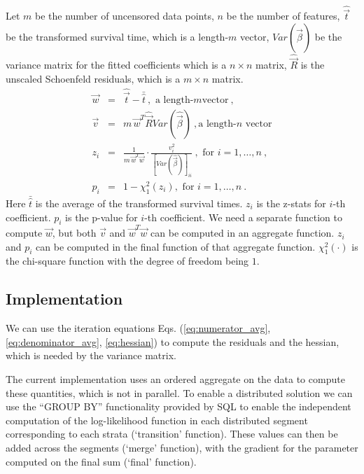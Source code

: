 Let $m$ be the number of uncensored data points, $n$ be the number of
features, $\hat{\vec{t}}$ be the transformed survival time, which is a
length-$m$ vector,
$\mathit{Var}(\hat{\vec{\beta}})$ be the variance matrix for the
fitted coefficients which is a $n\times n$ matrix, $\hat{\vec{R}}$
is the unscaled Schoenfeld residuals, which is a $m\times n$ matrix.
\begin{eqnarray}
\vec{w} &=& \hat{\vec{t}} - \bar{\hat{t}}\ , \mbox{ a length-}m \mbox{
  vector}\ ,\\
\vec{v} &=& m\,\vec{w}^T\hat{\vec{R}}\mathit{Var}(\hat{\vec{\beta}})\ , \mbox{
a length-}n\mbox{ vector}\\
z_i &=& \frac{1}{m\,\vec{w}^T\vec{w}}
\cdot\frac{v^2_i}{\left[\mathit{Var}(\hat{\vec{\beta}})\right]_{ii}}\
, \mbox{ for }i=1,\dots,n\ ,\\
p_i &=& 1 - \chi_1^2(z_i), \mbox{ for }i=1,\dots,n\ .
\end{eqnarray}
Here $\bar{\hat{t}}$ is the average of the transformed survival
times. $z_i$ is the z-stats for $i$-th coefficient. $p_i$ is the
p-value for $i$-th coefficient. We need a separate function to compute
$\vec{w}$, but both $\vec{v}$ and $\vec{w}^T\vec{w}$ can be computed
in an aggregate function. $z_i$ and $p_i$ can be computed in the final
function of that aggregate function. $\chi^2_1(\cdot)$ is the
chi-square function with the degree of freedom being $1$.

\subsection{Implementation}
We can use the iteration equations Eqs. (\ref{eq:numerator_avg},
 \ref{eq:denominator_avg}, \ref{eq:hessian}) to compute the residuals and the
hessian, which is needed by the variance matrix.

The current implementation uses an ordered aggregate on the data to
compute these quantities, which is not in parallel. To enable a distributed
solution we can use the ``GROUP BY'' functionality provided by SQL to enable the
independent computation of the log-likelihood function in each distributed segment
corresponding to each strata (`transition' function). These values can then be added
across the segments (`merge' function), with the gradient for the parameter computed
on the final sum (`final' function).

